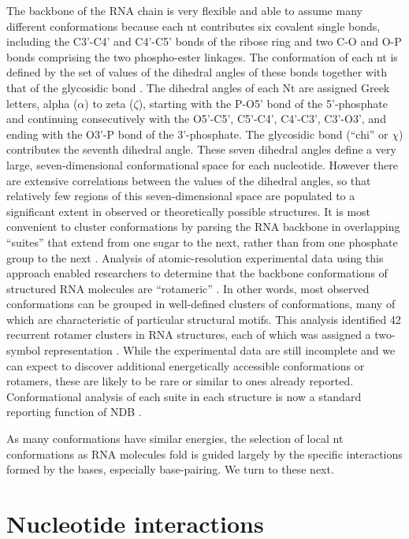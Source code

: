The backbone of the RNA chain is very flexible and able to assume many different
conformations because each nt contributes six covalent single bonds, including
the C3'-C4' and C4'-C5' bonds of the ribose ring and two C-O and O-P bonds
comprising the two phospho-ester linkages. The conformation of each nt is
defined by the set of values of the dihedral angles of these bonds together with
that of the glycosidic bond \cite{Neidle2008}. The dihedral angles of each Nt
are assigned Greek letters, alpha ($\alpha$) to zeta ($\zeta$), starting with
the P-O5' bond of the 5'-phosphate and continuing consecutively with the
O5'-C5', C5'-C4', C4'-C3', C3'-O3', and ending with the O3'-P bond of the
3'-phosphate. The glycosidic bond (``chi'' or $\chi$) contributes the seventh
dihedral angle. These seven dihedral angles define a very large,
seven-dimensional conformational space for each nucleotide. However there are
extensive correlations between the values of the dihedral angles, so that
relatively few regions of this seven-dimensional space are populated to a
significant extent in observed or theoretically possible structures. It is most
convenient to cluster conformations by parsing the RNA backbone in overlapping
``suites'' that extend from one sugar to the next, rather than from one
phosphate group to the next \cite{Richardson2008}. Analysis of atomic-resolution
experimental data using this approach enabled researchers to determine that the
backbone conformations of structured RNA molecules are ``rotameric''
\cite{Murray2003}. In other words, most observed conformations can be grouped in
well-defined clusters of conformations, many of which are characteristic of
particular structural motifs. This analysis identified 42 recurrent rotamer
clusters in RNA structures, each of which was assigned a two-symbol
representation \cite{Richardson2008}. While the experimental data are still
incomplete and we can expect to discover additional energetically accessible
conformations or rotamers, these are likely to be rare or similar to ones
already reported. Conformational analysis of each suite in each structure is now
a standard reporting function of NDB \cite{CoimbatoreNarayanan2014}. 

As many conformations have similar energies, the selection of local nt
conformations as RNA molecules fold is guided largely by the specific
interactions formed by the bases, especially base-pairing. We turn to these
next. 

\section{Nucleotide interactions}

